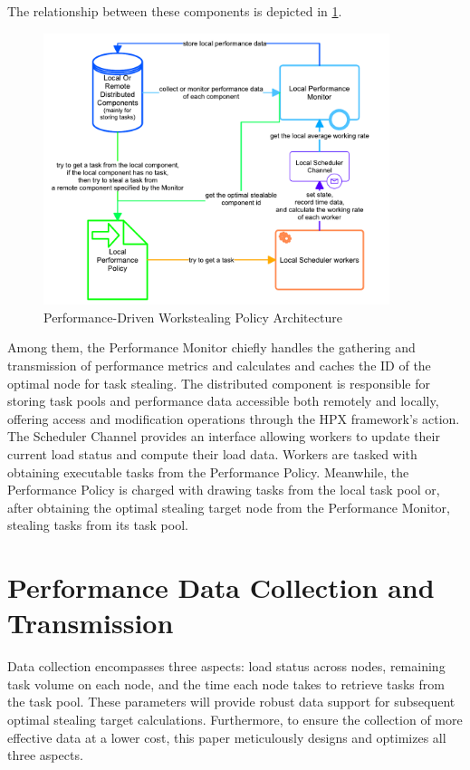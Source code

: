 \documentclass{mproj}
\begin{document}
The relationship between these components is depicted in \ref{fig:overall_architecture}.
\begin{figure}[h]
    \centering
    \includegraphics[width=0.9\textwidth]{images/overall_architecture.pdf}
    \caption{Performance-Driven Workstealing Policy Architecture}
    \label{fig:overall_architecture}
\end{figure}
\FloatBarrier

Among them, the Performance Monitor chiefly handles the gathering and transmission of performance metrics
and calculates and caches the ID of the optimal node for task stealing.
The distributed component is responsible for storing task pools and performance data
accessible both remotely and locally, offering access and modification operations through the HPX framework's action.
The Scheduler Channel provides an interface allowing workers to update their current load status
and compute their load data. Workers are tasked with obtaining executable tasks from the Performance Policy.
Meanwhile, the Performance Policy is charged with drawing tasks from the local task pool
or, after obtaining the optimal stealing target node from the Performance Monitor, stealing tasks from its task pool.


\section{Performance Data Collection and Transmission}
Data collection encompasses three aspects: load status across nodes,
remaining task volume on each node,
and the time each node takes to retrieve tasks from the task pool.
These parameters will provide robust data support for subsequent optimal stealing target calculations.
Furthermore, to ensure the collection of more effective data at a lower cost,
this paper meticulously designs and optimizes all three aspects.
\end{document}
